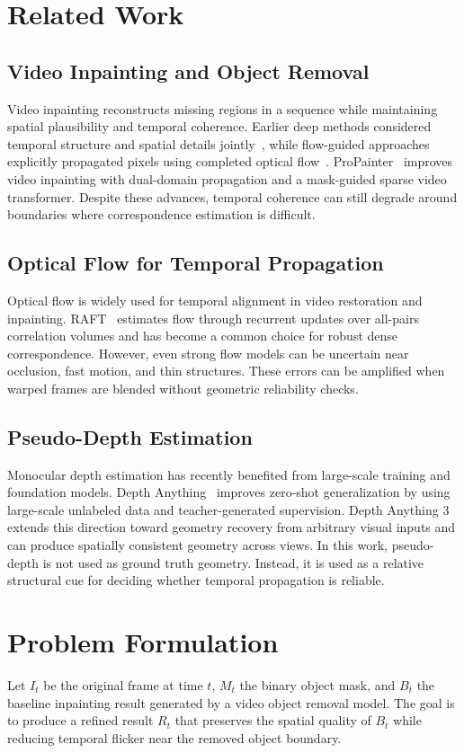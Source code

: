 \documentclass[nouppercase]{kaia}
\begin{document}
\section{Related Work}
\subsection{Video Inpainting and Object Removal}
Video inpainting reconstructs missing regions in a sequence while maintaining spatial plausibility and temporal coherence. Earlier deep methods considered temporal structure and spatial details jointly~\cite{wang2018video}, while flow-guided approaches explicitly propagated pixels using completed optical flow~\cite{xu2019deep}. ProPainter~\cite{zhou2023propainter} improves video inpainting with dual-domain propagation and a mask-guided sparse video transformer. Despite these advances, temporal coherence can still degrade around boundaries where correspondence estimation is difficult.

\subsection{Optical Flow for Temporal Propagation}
Optical flow is widely used for temporal alignment in video restoration and inpainting. RAFT~\cite{teed2020raft} estimates flow through recurrent updates over all-pairs correlation volumes and has become a common choice for robust dense correspondence. However, even strong flow models can be uncertain near occlusion, fast motion, and thin structures. These errors can be amplified when warped frames are blended without geometric reliability checks.

\subsection{Pseudo-Depth Estimation}
Monocular depth estimation has recently benefited from large-scale training and foundation models. Depth Anything~\cite{yang2024depthanything} improves zero-shot generalization by using large-scale unlabeled data and teacher-generated supervision. Depth Anything 3~\cite{lin2025depthanything3} extends this direction toward geometry recovery from arbitrary visual inputs and can produce spatially consistent geometry across views. In this work, pseudo-depth is not used as ground truth geometry. Instead, it is used as a relative structural cue for deciding whether temporal propagation is reliable.

\section{Problem Formulation}
Let $I_t$ be the original frame at time $t$, $M_t$ the binary object mask, and $B_t$ the baseline inpainting result generated by a video object removal model. The goal is to produce a refined result $R_t$ that preserves the spatial quality of $B_t$ while reducing temporal flicker near the removed object boundary.
\end{document}
